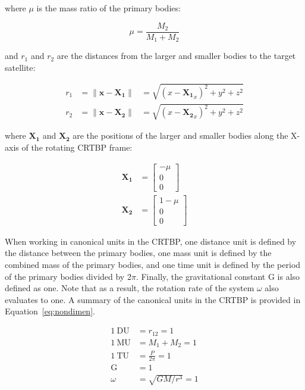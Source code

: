 \documentclass[letterpaper, preprint, paper,11pt]{AAS}	%
\begin{document}
where \(\mu\) is the mass ratio of the primary bodies:

\begin{equation}
	\mu = \frac{M_2}{M_1 + M_2}
\end{equation}

and \(r_1\) and \(r_2\) are the distances from the larger and smaller bodies to the target satellite:

\begin{equation}
	\begin{aligned}
		r_1 &= \| \mathbf{x} - \mathbf{X_1} \| &= \sqrt{(x-\mathbf{X_1}_x)^2 + y^2 + z^2} \\
		r_2 &= \| \mathbf{x} - \mathbf{X_2} \| &= \sqrt{(x-\mathbf{X_2}_x)^2 + y^2 + z^2}
	\end{aligned}
\end{equation}

where \(\mathbf{X_1}\) and \(\mathbf{X_2}\) are the positions of the larger and smaller bodies along the X-axis of the rotating CRTBP frame:

\begin{equation}
	\begin{aligned}
		\mathbf{X_1} &= \begin{bmatrix}
			-\mu \\ 0 \\ 0 
		\end{bmatrix} \\
		\mathbf{X_2} &= \begin{bmatrix}
			1 - \mu \\ 0 \\ 0
		\end{bmatrix}
	\end{aligned}
\end{equation}

When working in canonical units in the CRTBP, one distance unit is defined by the distance between the primary bodies, one mass unit is defined by the combined mass of the primary bodies, and one time unit is defined by the period of the primary bodies divided by 2\(\pi\).  Finally, the gravitational constant G is also defined as one. Note that as a result, the rotation rate of the system \(\omega\) also evaluates to one. A summary of the canonical units in the CRTBP is provided in Equation~\eqref{eq:nondimen}.

\begin{equation} \label{eq:nondimen}
\begin{aligned}
\mathrm{1 \: DU} &= r_{12} = 1 \\           %
\mathrm{1 \: MU} &= M_1 + M_2 = 1 \\
\mathrm{1 \: TU} &= \frac{P}{2\pi} = 1 \\
\mathrm{G} &= 1 \\
\omega &= \sqrt{GM/r^3} = 1
\end{aligned}
\end{equation}
\end{document}
